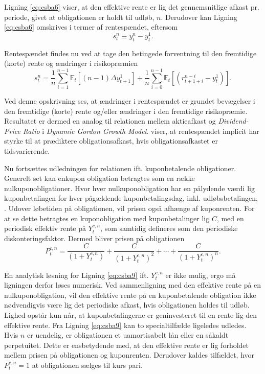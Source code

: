 \documentclass[
  a4paper,
  oneside]{memoir}
\begin{document}
Ligning \eqref{eq:csba6} viser, at den effektive rente er lig det gennemsnitlige afkast pr. periode, givet at obligationen er holdt til udløb, \(n\). Derudover kan Ligning \eqref{eq:csba6} omskrives i termer af rentespændet, eftersom
\begin{equation}
s_t^n\equiv y_t^n - y_t^1. \label{eq:csba7}
\end{equation}

Rentespændet findes nu ved at tage den betingede forventning til den fremtidige (korte) rente og ændringer i risikopræmien
\begin{equation}
s_t^n=\frac{1}{n} \sum_{i=1}^{n-1} \mathbb{E}_t\left[(n-1)\Delta y_{t+1}^1\right] + \frac{1}{n}\sum_{i=0}^{n-1}\mathbb{E}_t\left[(r_{t+1+i}^{n-i}-y_t^1)\right]. \label{eq:csba8}
\end{equation}

Ved denne opskrivning ses, at ændringer i rentespændet er grundet bevægelser i den fremtidige (korte) rente og/eller ændringer i den fremtidige risikopræmie. Resultatet er dermed en analog til relationen mellem aktieafkast og \emph{Dividend-Price Ratio} i \emph{Dynamic Gordon Growth Model}. \citep{Fama1987} viser, at rentespændet implicit har styrke til at prædiktere obligationsafkast, hvis obligationsafkastet er tidsvarierende.

Nu fortsættes udledningen for relationen ift. kuponbetalende obligationer. Generelt set kan enkupon obligation betragtes som en række nulkuponobligationer. Hvor hver nulkuponobligation har en pålydende værdi lig kuponbetalingen for hver pågældende kuponbetalingsdag, inkl. udløbsbetalingen, \citep{Campbell1997}. Udover løbetiden på obligationen, vil prisen også afhænge af kuponrenten. For at se dette betragtes en kuponobligation med kuponbetalinger lig \(C\), med en periodisk effektiv rente på \(Y_t^{c,n}\), som samtidig defineres som den periodiske diskonteringsfaktor. Dermed bliver prisen på obligationen
\begin{equation}
P_t^{c,n}=\frac{C}{(1+Y_t^{c,n})}+\frac{C}{(1+Y_t^{c,n})^2}+\cdots+\frac{C}{(1+Y_t^{c,n})^n}.  \label{eq:csba9}
\end{equation}

En analytisk løsning for Ligning \eqref{eq:csba9} ift. \(Y_t^{c,n}\) er ikke mulig, ergo må ligningen derfor løses numerisk. Ved sammenligning med den effektive rente på en nulkuponobligation, vil den effektive rente på en kuponbetalende obligation ikke nødvendigvis være lig det periodiske afkast, hvis obligationen holdes til udløb. Lighed opstår kun når, at kuponbetalingerne er geninvesteret til en rente lig den effektive rente. Fra Ligning \eqref{eq:csba9} kan to specialtilfælde ligeledes udledes. Hvis \(n\) er uendelig, er obligationen et uamortisabelt lån eller en såkaldt perpetuitet. Dette er ensbetydende med, at den effektive rente er lig forholdet mellem prisen på obligationen og kuponrenten. Derudover kaldes tilfældet, hvor \(P_t^{c,n}=1\) at obligationen sælges til kurs pari.
\end{document}

